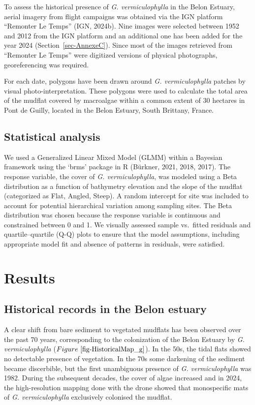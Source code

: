 \documentclass[
  letterpaper,
  11pt,
  english,
  singlespacing,
  headsepline]{MastersDoctoralThesis}
\begin{document}
\begin{spacing}{1.5}
To assess the historical presence of \emph{G. vermiculophylla} in the
Belon Estuary, aerial imagery from flight campaigns was obtained via the
IGN platform ``Remonter Le Temps'' (IGN, 2024b). Nine images were
selected between 1952 and 2012 from the IGN platform and an additional
one has been added for the year 2024 (Section~\ref{sec-AnnexeC}). Since
most of the images retrieved from ``Remonter Le Temps'' were digitized
versions of physical photographs, georeferencing was required.

For each date, polygons have been drawn around \emph{G. vermiculophylla}
patches by visual photo-interpretation. These polygons were used to
calculate the total area of the mudflat covered by macroalgae within a
common extent of 30 hectares in Pont de Guilly, located in the Belon
Estuary, South Brittany, France.

\subsection{Statistical analysis}\label{statistical-analysis-1}

We used a Generalized Linear Mixed Model (GLMM) within a Bayesian
framework using the `brms' package in R (Bürkner, 2021, 2018, 2017). The
response variable, the cover of \emph{G. vermiculophylla}, was modeled
using a Beta distribution as a function of bathymetry elevation and the
slope of the mudflat (categorized as Flat, Angled, Steep). A random
intercept for site was included to account for potential hierarchical
variation among sampling sites. The Beta distribution was chosen because
the response variable is continuous and constrained between 0 and 1. We
visually assessed sample vs.~fitted residuals and quartile--quartile
(Q-Q) plots to ensure that the model assumptions, including appropriate
model fit and absence of patterns in residuals, were satisfied.

\section{Results}\label{results-2}

\subsection{Historical records in the Belon
estuary}\label{historical-records-in-the-belon-estuary}

A clear shift from bare sediment to vegetated mudflats has been observed
over the past 70 years, corresponding to the colonization of the Belon
Estuary by \emph{G. vermiculophylla}
(\(Figure~\ref{fig-HistoricalMap_g}\)). In the 50s, the tidal flats
showed no detectable presence of vegetation. In the 70s some darkening
of the sediment became discerbible, but the first unambiguous presence
of \emph{G. vermiculophylla} was 1982. During the subsequent decades,
the cover of algae increased and in 2024, the high-resolution mapping
done with the drone showed that monospecific mats of \emph{G.
vermiculophylla} exclusively colonised the mudflat.


\end{spacing}
\end{document}
